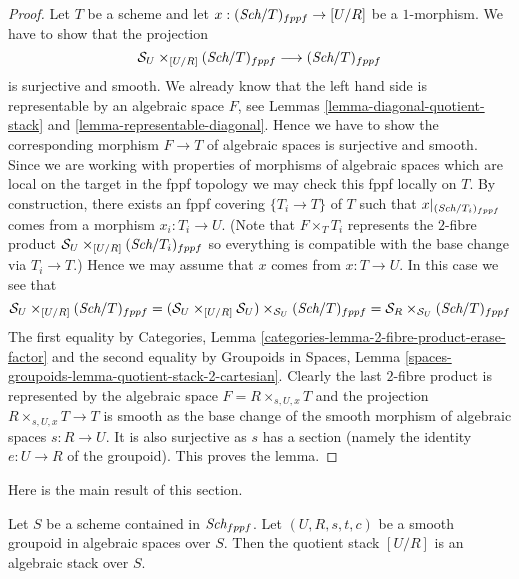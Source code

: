 \begin{proof}
Let $T$ be a scheme and let $x : (\textit{Sch}/T)_{fppf} \to [U/R]$
be a $1$-morphism. We have to show that the projection
$$
\mathcal{S}_U \times_{[U/R]} (\textit{Sch}/T)_{fppf}
\longrightarrow
(\textit{Sch}/T)_{fppf}
$$
is surjective and smooth. We already know that the left hand side
is representable by an algebraic space $F$, see
Lemmas \ref{lemma-diagonal-quotient-stack} and
\ref{lemma-representable-diagonal}.
Hence we have to show the corresponding morphism $F \to T$ of
algebraic spaces is surjective and smooth.
Since we are working with properties of morphisms of algebraic
spaces which are local on the target in the fppf topology we
may check this fppf locally on $T$. By construction, there exists
an fppf covering $\{T_i \to T\}$ of $T$ such that
$x|_{(\textit{Sch}/T_i)_{fppf}}$ comes from a morphism
$x_i : T_i \to U$. (Note that $F \times_T T_i$ represents the
$2$-fibre product $\mathcal{S}_U \times_{[U/R]} (\textit{Sch}/T_i)_{fppf}$
so everything is compatible with the base change via $T_i \to T$.)
Hence we may assume that $x$ comes from $x : T \to U$.
In this case we see that
$$
\mathcal{S}_U \times_{[U/R]} (\textit{Sch}/T)_{fppf}
=
(\mathcal{S}_U \times_{[U/R]} \mathcal{S}_U)
\times_{\mathcal{S}_U} (\textit{Sch}/T)_{fppf}
=
\mathcal{S}_R \times_{\mathcal{S}_U} (\textit{Sch}/T)_{fppf}
$$
The first equality by
Categories, Lemma \ref{categories-lemma-2-fibre-product-erase-factor}
and the second equality by
Groupoids in Spaces,
Lemma \ref{spaces-groupoids-lemma-quotient-stack-2-cartesian}.
Clearly the last $2$-fibre product is represented by the algebraic
space $F = R \times_{s, U, x} T$ and the projection
$R \times_{s, U, x} T \to T$ is smooth as the base change of
the smooth morphism of algebraic spaces $s : R \to U$.
It is also surjective as $s$ has a section (namely the identity
$e : U \to R$ of the groupoid).
This proves the lemma.
\end{proof}

\noindent
Here is the main result of this section.

\begin{theorem}
\label{theorem-smooth-groupoid-gives-algebraic-stack}
Let $S$ be a scheme contained in $\textit{Sch}_{fppf}$.
Let $(U, R, s, t, c)$ be a smooth groupoid in algebraic spaces over $S$.
Then the quotient stack $[U/R]$ is an algebraic stack over $S$.
\end{theorem}

